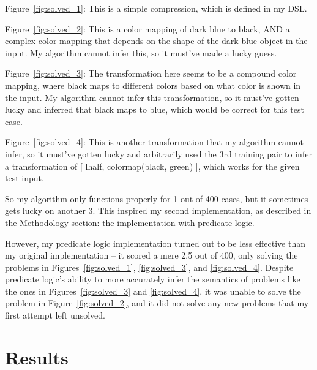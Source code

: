 \documentclass[letterpaper]{article} %
\begin{document}
\bigskip

\noindent Figure~\ref{fig:solved_1}: This is a simple compression, which is defined in my DSL.

\bigskip

\noindent Figure~\ref{fig:solved_2}: This is a color mapping of dark blue to black, AND a complex color mapping that depends on the shape of the dark blue object in the input. My algorithm cannot infer this, so it must've made a lucky guess.

\bigskip

\noindent Figure~\ref{fig:solved_3}: The transformation here seems to be a compound color mapping, where black maps to different colors based on what color is shown in the input. My algorithm cannot infer this transformation, so it must've gotten lucky and inferred that black maps to blue, which would be correct for this test case.

\bigskip

\noindent Figure~\ref{fig:solved_4}: This is another transformation that my algorithm cannot infer, so it must've gotten lucky and arbitrarily used the 3rd training pair to infer a transformation of [ lhalf, colormap(black, green) ], which works for the given test input.

\bigskip

So my algorithm only functions properly for 1 out of 400 cases, but it sometimes gets lucky on another 3. This inspired my second implementation, as described in the Methodology section: the implementation with predicate logic.

\bigskip

However, my predicate logic implementation turned out to be less effective than my original implementation -- it scored a mere 2.5 out of 400,  only solving the problems in Figures~\ref{fig:solved_1}, \ref{fig:solved_3}, and \ref{fig:solved_4}. Despite predicate logic's ability to more accurately infer the semantics of problems like the ones in Figures~\ref{fig:solved_3} and \ref{fig:solved_4}, it was unable to solve the problem in Figure~\ref{fig:solved_2}, and it did not solve any new problems that my first attempt left unsolved.

\section{Results}

\renewcommand{\arraystretch}{1.5} %
\setlength{\tabcolsep}{10pt}      %
\end{document}
